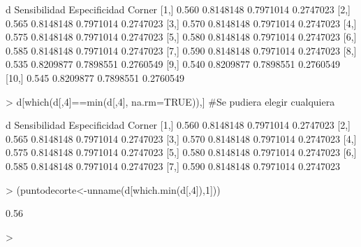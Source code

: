 \documentclass[11pt,onside]{article}
\begin{document}
\begin{itemize}
\begin{Schunk}
\begin{Soutput}
          d Sensibilidad Especificidad    Corner
 [1,] 0.560    0.8148148     0.7971014 0.2747023
 [2,] 0.565    0.8148148     0.7971014 0.2747023
 [3,] 0.570    0.8148148     0.7971014 0.2747023
 [4,] 0.575    0.8148148     0.7971014 0.2747023
 [5,] 0.580    0.8148148     0.7971014 0.2747023
 [6,] 0.585    0.8148148     0.7971014 0.2747023
 [7,] 0.590    0.8148148     0.7971014 0.2747023
 [8,] 0.535    0.8209877     0.7898551 0.2760549
 [9,] 0.540    0.8209877     0.7898551 0.2760549
[10,] 0.545    0.8209877     0.7898551 0.2760549
\end{Soutput}
\begin{Sinput}
> d[which(d[,4]==min(d[,4], na.rm=TRUE)),] #Se pudiera elegir cualquiera
\end{Sinput}
\begin{Soutput}
         d Sensibilidad Especificidad    Corner
[1,] 0.560    0.8148148     0.7971014 0.2747023
[2,] 0.565    0.8148148     0.7971014 0.2747023
[3,] 0.570    0.8148148     0.7971014 0.2747023
[4,] 0.575    0.8148148     0.7971014 0.2747023
[5,] 0.580    0.8148148     0.7971014 0.2747023
[6,] 0.585    0.8148148     0.7971014 0.2747023
[7,] 0.590    0.8148148     0.7971014 0.2747023
\end{Soutput}
\begin{Sinput}
> (puntodecorte<-unname(d[which.min(d[,4]),1])) 
\end{Sinput}
\begin{Soutput}
[1] 0.56
\end{Soutput}
\begin{Sinput}
> 
\end{Sinput}
\end{Schunk}



\end{itemize}
\end{document}
